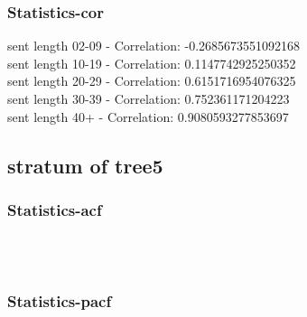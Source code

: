 \documentclass{article}%
\begin{document}
%
\newpage%
\subsubsection{Statistics{-}cor}%
\label{ssubsec:Statistics{-}cor}%
\noindent%
sent length 02-09 - Correlation: -0.2685673551092168\\%
sent length 10-19 - Correlation: 0.1147742925250352\\%
sent length 20-29 - Correlation: 0.6151716954076325\\%
sent length 30-39 - Correlation: 0.752361171204223\\%
sent length 40+ - Correlation: 0.9080593277853697\\

%
\newpage

%
\subsection{stratum of tree5}%
\label{subsec:stratumoftree5}%
\subsubsection{Statistics{-}acf}%
\label{ssubsec:Statistics{-}acf}%


\begin{figure}[ht]%
\centering%
\setlength{\abovecaptionskip}{-35pt}%
%
%
\\%
%
%
\\%
%
\end{figure}

%
\newpage%
\subsubsection{Statistics{-}pacf}%
\label{ssubsec:Statistics{-}pacf}%
\end{document}
